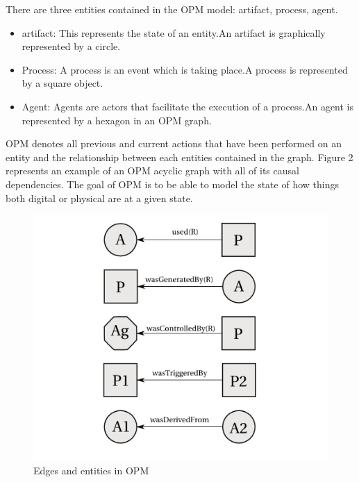  There are three entities contained in the OPM model: artifact, process, agent. 

\begin{itemize}
\item
artifact: This represents the state of an entity.An artifact is graphically represented by a circle.

\item
Process: A process is an event which is taking place.A process is represented by a square object.

\item 
Agent: Agents are actors that facilitate the execution of a process.An agent is represented by a hexagon in an OPM graph.
\end{itemize}

OPM denotes all previous and current actions that have been performed on an entity and  the relationship between each entities contained in the graph. Figure 2 represents an example of an OPM acyclic graph with all of its causal dependencies. The goal of OPM is to be able to model the state of how things both digital or physical are at a given state.   

\begin{figure}[h]
\begin{center}

\includegraphics{opm_convention.PNG}
\end{center}
\caption{Edges and entities in OPM}
\label{autom}
\end{figure}


